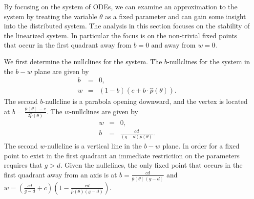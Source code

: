 \documentclass[12pt]{article}
\begin{document}
By focusing on the system of ODEs, we can examine an approximation to
the system by treating the variable $\theta$ as a fixed parameter and
can gain some insight into the distributed system. The analysis in
this section focuses on the stability of the linearized system. In
particular the focus is on the non-trivial fixed points that occur in
the first quadrant away from $b=0$ and away from $w=0$.

We first determine the nullclines for the system.
The $b$-nullclines for the system in the $b-w$ plane are given by
\begin{eqnarray}
  \label{eq:bnullclines}
  b & = & 0, \\
  w & = & (1-b)(c+b\cdot \hat{p}(\theta)).
\end{eqnarray}
The second $b$-nullcline is a parabola opening downward, and the vertex is located at
$b=\frac{\hat{p}(\theta)-c}{2\hat{p}(\theta)}$. The $w$-nullclines are given by
\begin{eqnarray}
  \label{eq:wnullclines}
  w & = & 0, \\
  b & = & \frac{cd}{(g-d)\hat{p}(\theta)}.
\end{eqnarray}
The second $w$-nullcline is a vertical line in the $b-w$ plane. In
order for a fixed point to exist in the first quadrant an immediate
restriction on the parameters requires that $g>d$.  Given the
nullclines, the only fixed point that occurs in the first quadrant
away from an axis is at $b=\frac{cd}{\hat{p}(\theta)(g-d)}$ and
$w=\left(\frac{cd}{g-d}+c\right)
\left(1-\frac{cd}{\hat{p}(\theta)(g-d)}\right)$.
\end{document}
